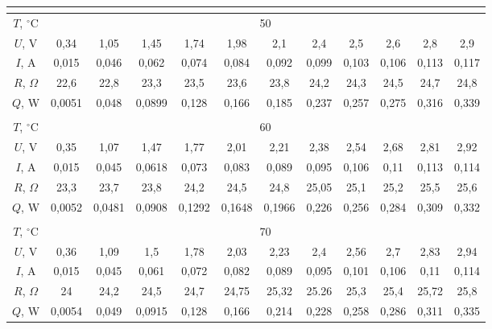 \documentclass[12pt, a4paper]{article}
\begin{document}
\begin{table}[H]
\begin{tabular}{|c|c|c|c|c|c|c|c|c|c|c|c|}
\multicolumn{12}{|c|}{}                                                        \\ \hline
$T$, $^\circ$C   & \multicolumn{11}{c|}{50}                                           \\ \hline
$U$, V   & 0,34  & 1,05  & 1,45  & 1,74  & 1,98  & 2,1  & 2,4 & 2,5 & 2,6 & 2,8 & 2,9 \\ \hline
$I$, A   & 0,015  & 0,046  & 0,062  & 0,074  & 0,084  & 0,092  & 0,099 & 0,103 & 0,106 & 0,113 & 0,117\\ \hline
$R$, $\Omega$ & 22,6 & 22,8 & 23,3 & 23,5 & 23,6 & 23,8 & 24,2 & 24,3 & 24,5 & 24,7 & 24,8 \\ \hline
$Q$, W    & 0,0051  & 0,048  & 0,0899  & 0,128  & 0,166  & 0,185  & 0,237 & 0,257 & 0,275 & 0,316 & 0,339\\ \hline
\multicolumn{12}{|c|}{}                                                        \\ \hline
$T$, $^\circ$C   & \multicolumn{11}{c|}{60}                                           \\ \hline
$U$, V   & 0,35  & 1,07  & 1,47  & 1,77  & 2,01  & 2,21  & 2,38 & 2,54 & 2,68 & 2,81 & 2,92 \\ \hline
$I$, A   & 0,015  & 0,045  & 0,0618  & 0,073  & 0,083  & 0,089  & 0,095 & 0,106 & 0,11 & 0,113 & 0,114\\ \hline
$R$, $\Omega$ & 23,3 & 23,7 & 23,8 & 24,2 & 24,5 & 24,8 & 25,05 & 25,1 & 25,2 & 25,5 & 25,6 \\ \hline
$Q$, W    & 0,0052  & 0,0481  & 0,0908  & 0,1292  & 0,1648  & 0,1966  & 0,226 & 0,256 & 0,284 & 0,309 & 0,332\\ \hline
\multicolumn{12}{|c|}{}                                                        \\ \hline
$T$, $^\circ$C   & \multicolumn{11}{c|}{70}                                           \\ \hline
$U$, V   & 0,36  & 1,09  & 1,5  & 1,78  & 2,03  & 2,23  & 2,4 & 2,56 & 2,7 & 2,83 & 2,94\\ \hline
$I$, A   & 0,015  & 0,045  & 0,061  & 0,072  & 0,082  & 0,089  & 0,095 & 0,101 & 0,106 & 0,11 & 0,114\\ \hline
$R$, $\Omega$ & 24 & 24,2 & 24,5 & 24,7 & 24,75 & 25,32 & 25.26 & 25,3 & 25,4 & 25,72 & 25,8\\ \hline
$Q$, W    & 0,0054  & 0,049  & 0,0915  & 0,128  & 0,166  & 0,214  & 0,228 & 0,258 & 0,286 & 0,311 & 0,335\\ \hline
\end{tabular}
\end{table}
\end{document}

